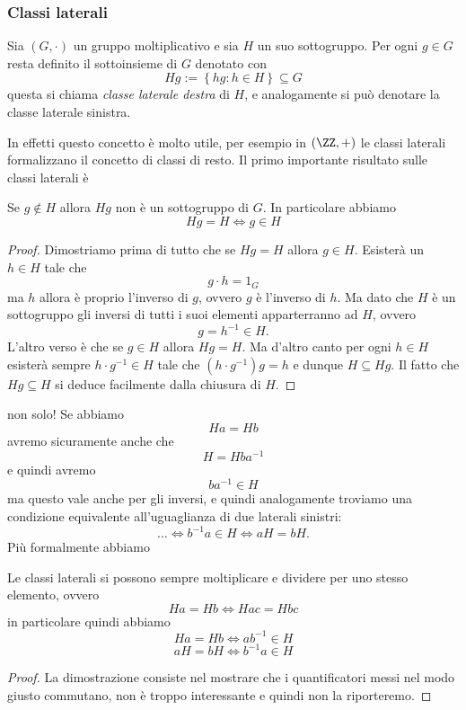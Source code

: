 \documentclass[11pt]{scrartcl}
\begin{document}
	\subsubsection{Classi laterali}
	\begin{definition}
		Sia $(G,\cdot)$ un gruppo moltiplicativo e sia $H$ un suo sottogruppo. Per ogni $g\in G$ resta definito il sottoinsieme di $G$ denotato con 
		$$Hg:=\left\{hg:h\in H\right\}\subseteq G$$
		questa si chiama \textit{classe laterale destra} di $H$, e analogamente si può denotare la classe laterale sinistra.
	\end{definition}
	In effetti questo concetto è molto utile, per esempio in $(\ZZ,+)$ le classi laterali formalizzano il concetto di classi di resto. Il primo importante risultato sulle classi laterali è
	\begin{lemma}
		Se $g\not\in H$ allora $Hg$ non è un sottogruppo di $G$. In particolare abbiamo
		$$Hg=H \iff g\in H$$
	\end{lemma}
	\begin{proof}
		Dimostriamo prima di tutto che se $Hg=H$ allora $g\in H$. Esisterà un $h\in H$ tale che $$g\cdot h=1_G$$
		ma $h$ allora è proprio l'inverso di $g$, ovvero $g$ è l'inverso di $h$. Ma dato che $H$ è un sottogruppo gli inversi di tutti i suoi elementi apparterranno ad $H$, ovvero
		$$g=h^{-1}\in H.$$
		L'altro verso è che se $g\in H$ allora $Hg=H$. Ma d'altro canto per ogni $h\in H$ esisterà sempre $h\cdot g^{-1}\in H$ tale che $(h\cdot g^{-1})g=h$ e dunque $H\subseteq Hg$. Il fatto che $Hg\subseteq H$ si deduce facilmente dalla chiusura di $H$.
	\end{proof}
	non solo! Se abbiamo
	$$Ha=Hb$$
	avremo sicuramente anche che
	$$H=Hba^{-1}$$
	e quindi avremo
	$$ba^{-1}\in H$$
	ma questo vale anche per gli inversi, e quindi analogamente troviamo una condizione equivalente all'uguaglianza di due laterali sinistri:
	$$\dots \iff b^{-1}a \in H \iff aH=bH.$$
	Più formalmente abbiamo
	\begin{lemma}\label{gruppi:aritmetica delle classi laterali}
		Le classi laterali si possono sempre moltiplicare e dividere per uno stesso elemento, ovvero
		$$Ha=Hb \iff Hac=Hbc$$
		in particolare quindi abbiamo
		$$Ha=Hb \iff ab^{-1}\in H$$
		$$aH=bH \iff b^{-1}a\in H$$
	\end{lemma}
	\begin{proof}
		La dimostrazione consiste nel mostrare che i quantificatori messi nel modo giusto commutano, non è troppo interessante e quindi non la riporteremo.
	\end{proof}
\end{document}
